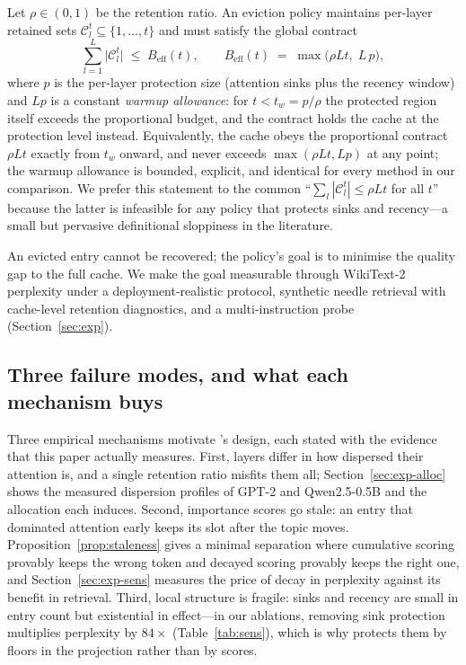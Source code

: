 Let $\rho\in(0,1)$ be the retention ratio. An eviction policy maintains
per-layer retained sets $\mathcal{C}_l^{t}\subseteq\{1,\dots,t\}$ and must
satisfy the global contract
\begin{equation}\label{eq:contract}
\sum_{l=1}^{L}\bigl|\mathcal{C}_l^{t}\bigr| \;\le\; B_{\mathrm{eff}}(t),
\qquad
B_{\mathrm{eff}}(t) \;=\; \max\!\bigl(\rho L t,\; L\,p\bigr),
\end{equation}
where $p$ is the per-layer protection size (attention sinks plus the
recency window) and $L p$ is a constant \emph{warmup allowance}: for
$t < t_w = p/\rho$ the protected region itself exceeds the proportional
budget, and the contract holds the cache at the protection level instead.
Equivalently, the cache obeys the proportional contract $\rho L t$ exactly
from $t_w$ onward, and never exceeds $\max(\rho L t, Lp)$ at any point;
the warmup allowance is bounded, explicit, and identical for every method
in our comparison. We prefer this statement to the common
``$\sum_l|\mathcal{C}_l^t|\le\rho Lt$ for all $t$'' because the latter is
infeasible for any policy that protects sinks and recency---a small but
pervasive definitional sloppiness in the literature.

An evicted entry cannot be recovered; the policy's goal is to minimise
the quality gap to the full cache. We make the goal measurable through
WikiText-2 perplexity under a deployment-realistic protocol, synthetic
needle retrieval with cache-level retention diagnostics, and a
multi-instruction probe (Section~\ref{sec:exp}).

\subsection{Three failure modes, and what each mechanism buys}

Three empirical mechanisms motivate \sage{}'s design, each stated with the
evidence that this paper actually measures. First, layers differ in how
dispersed their attention is, and a single retention ratio misfits them
all; Section~\ref{sec:exp-alloc} shows the measured dispersion profiles
of GPT-2 and Qwen2.5-0.5B and the allocation each induces. Second,
importance scores go stale: an entry that dominated attention early keeps
its slot after the topic moves. Proposition~\ref{prop:staleness} gives a
minimal separation where cumulative scoring provably keeps the wrong
token and decayed scoring provably keeps the right one, and
Section~\ref{sec:exp-sens} measures the price of decay in perplexity
against its benefit in retrieval. Third, local structure is fragile:
sinks and recency are small in entry count but existential in effect---in
our ablations, removing sink protection multiplies perplexity by
$84\times$ (Table~\ref{tab:sens}), which is why \dre{} protects them by
floors in the projection rather than by scores.
